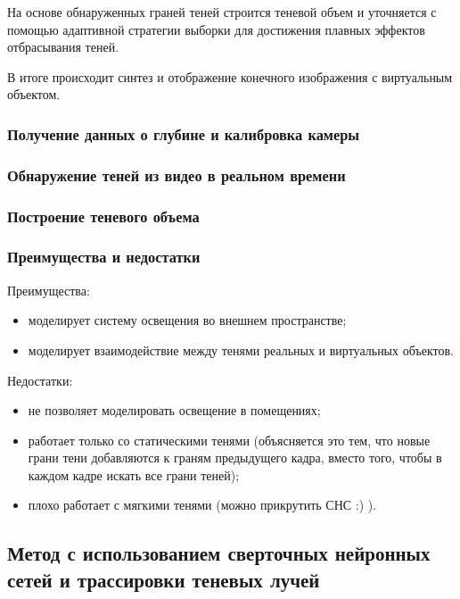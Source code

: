 На основе обнаруженных граней теней строится теневой объем и уточняется с помощью адаптивной стратегии выборки \cite{THOMASIAN2022385} для достижения плавных эффектов отбрасывания теней.

В итоге происходит синтез и отображение конечного изображения с виртуальным объектом.

\subsubsection*{Получение данных о глубине и калибровка камеры}



\subsubsection*{Обнаружение теней из видео в реальном времени}



\subsubsection*{Построение теневого объема}



\subsubsection*{Преимущества и недостатки}

Преимущества:
\begin{itemize}
	\item моделирует систему освещения во внешнем пространстве;
	\item моделирует взаимодействие между тенями реальных и виртуальных объектов.
\end{itemize}


Недостатки:
\begin{itemize}
	\item не позволяет моделировать освещение в помещениях;
	\item работает только со статическими тенями (объясняется это тем, что новые грани тени добавляются к граням предыдущего кадра, вместо того, чтобы в каждом кадре искать все грани теней);
	\item плохо работает с мягкими тенями (можно прикрутить СНС :) ).
\end{itemize}


\subsection{Метод с использованием сверточных нейронных сетей и трассировки теневых лучей}

